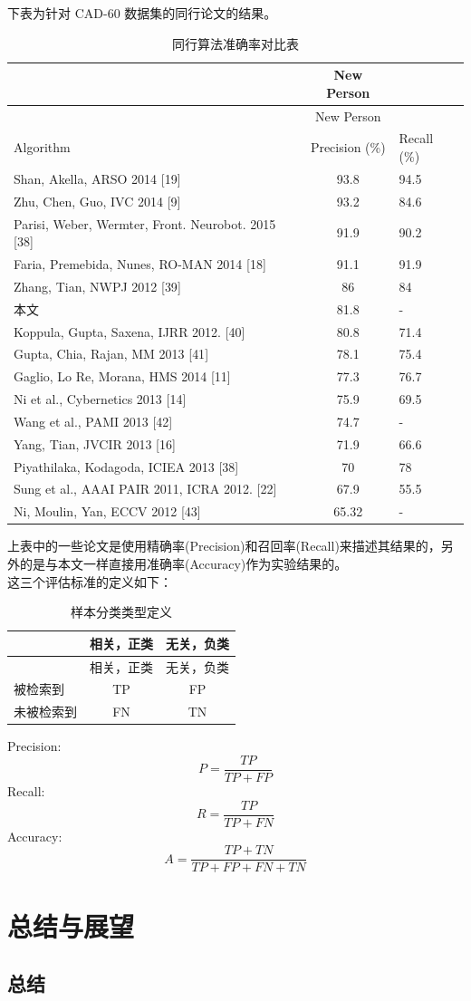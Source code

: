 下表为针对 CAD-60 数据集的同行论文的结果。

\begin{longtable}[c]{@{}lcl@{}}
\caption{同行算法准确率对比表}\tabularnewline
\toprule
& New Person &\tabularnewline
\midrule
\endfirsthead
\toprule
& New Person &\tabularnewline
\midrule
\endhead
Algorithm & Precision (\%) & Recall (\%)\tabularnewline
Shan, Akella, ARSO 2014 {[}19{]} & 93.8 & 94.5\tabularnewline
Zhu, Chen, Guo, IVC 2014 {[}9{]} & 93.2 & 84.6\tabularnewline
Parisi, Weber, Wermter, Front. Neurobot. 2015 {[}38{]} & 91.9 &
90.2\tabularnewline
Faria, Premebida, Nunes, RO-MAN 2014 {[}18{]} & 91.1 &
91.9\tabularnewline
Zhang, Tian, NWPJ 2012 {[}39{]} & 86 & 84\tabularnewline
本文 & 81.8 & -\tabularnewline
Koppula, Gupta, Saxena, IJRR 2012. {[}40{]} & 80.8 & 71.4\tabularnewline
Gupta, Chia, Rajan, MM 2013 {[}41{]} & 78.1 & 75.4\tabularnewline
Gaglio, Lo Re, Morana, HMS 2014 {[}11{]} & 77.3 & 76.7\tabularnewline
Ni et al., Cybernetics 2013 {[}14{]} & 75.9 & 69.5\tabularnewline
Wang et al., PAMI 2013 {[}42{]} & 74.7 & -\tabularnewline
Yang, Tian, JVCIR 2013 {[}16{]} & 71.9 & 66.6\tabularnewline
Piyathilaka, Kodagoda, ICIEA 2013 {[}38{]} & 70 & 78\tabularnewline
Sung et al., AAAI PAIR 2011, ICRA 2012. {[}22{]} & 67.9 &
55.5\tabularnewline
Ni, Moulin, Yan, ECCV 2012 {[}43{]} & 65.32 & -\tabularnewline
\bottomrule
\end{longtable}

上表中的一些论文是使用精确率(Precision)和召回率(Recall)来描述其结果的，另外的是与本文一样直接用准确率(Accuracy)作为实验结果的。\\这三个评估标准的定义如下：

\begin{longtable}[c]{@{}lcc@{}}
\caption{样本分类类型定义}\tabularnewline
\toprule
& 相关，正类 & 无关，负类\tabularnewline
\midrule
\endfirsthead
\toprule
& 相关，正类 & 无关，负类\tabularnewline
\midrule
\endhead
被检索到 & TP & FP\tabularnewline
未被检索到 & FN & TN\tabularnewline
\bottomrule
\end{longtable}

Precision: \[P=\frac{TP}{TP+FP}\] Recall: \[R=\frac{TP}{TP+FN}\]
Accuracy: \[A=\frac{TP+TN}{TP+FP+FN+TN}\]

\section{总结与展望}\label{ux603bux7ed3ux4e0eux5c55ux671b}

\subsection{总结}\label{ux603bux7ed3}

